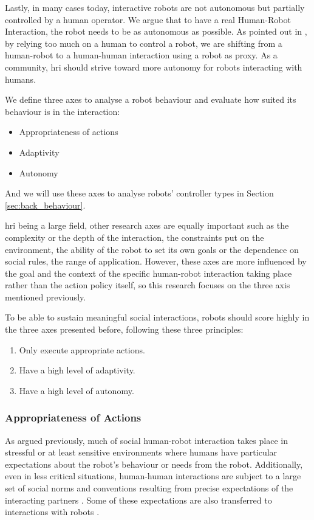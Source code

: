     Lastly, in many cases today, interactive robots are not autonomous but partially controlled by a human operator. We argue that to have a real Human-Robot Interaction, the robot needs to be as autonomous as possible. As pointed out in \citet{baxter2016characterising}, by relying too much on a human to control a robot, we are shifting from a human-robot to a human-human interaction using a robot as proxy. As a community, \gls{hri} should strive toward more autonomy for robots interacting with humans.
    
    We define three axes to analyse a robot behaviour and evaluate how suited its behaviour is in the interaction:
    \begin{itemize}
    	\item Appropriateness of actions
    	\item Adaptivity
    	\item Autonomy
    \end{itemize}
    And we will use these axes to analyse robots' controller types in Section \ref{sec:back_behaviour}.    
    
    \gls{hri} being a large field, other research axes are equally important such as the complexity or the depth of the interaction, the constraints put on the environment, the ability of the robot to set its own goals or the dependence on social rules, the range of application. However, these axes are more influenced by the goal and the context of the specific human-robot interaction taking place rather than the action policy itself, so this research focuses on the three axis mentioned previously.

	To be able to sustain meaningful social interactions, robots should score highly in the three axes presented before, following these three principles:
	
	\begin{enumerate}
		\item Only execute appropriate actions.
		\item Have a high level of adaptivity.
		\item Have a high level of autonomy.
	\end{enumerate}

\subsubsection{Appropriateness of Actions} \label{ssec:appropriateness} %
    As argued previously, much of social human-robot interaction takes place in  stressful or at least sensitive environments where humans have particular expectations about the robot's behaviour or needs from the robot. Additionally, even in less critical situations, human-human interactions are subject to a large set of social norms and conventions resulting from precise expectations of the interacting partners \citep{sherif1936psychology}. Some of these expectations are also transferred to interactions with robots \citep{bartneck2004design}.
	
